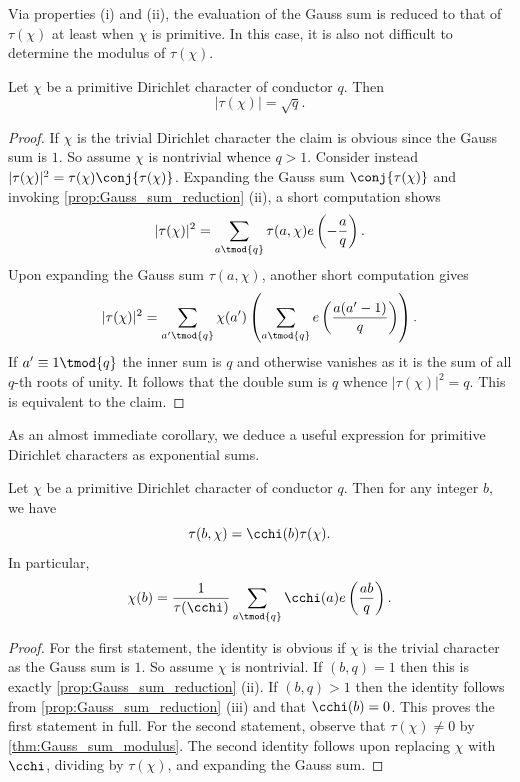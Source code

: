 \documentclass[12pt]{article}
\begin{document}
      Via properties (i) and (ii), the evaluation of the Gauss sum is reduced to that of \(\tau(\chi)\) at least when \(\chi\) is primitive. In this case, it is also not difficult to determine the modulus of \(\tau(\chi)\).

      \begin{theorem}\label{thm:Gauss_sum_modulus}
        Let \(\chi\) be a primitive Dirichlet character of conductor \(q\). Then
        \[
          |\tau(\chi)| = \sqrt{q}.
        \]
      \end{theorem}
      \begin{proof}
        If \(\chi\) is the trivial Dirichlet character the claim is obvious since the Gauss sum is \(1\). So assume \(\chi\) is nontrivial whence \(q > 1\). Consider instead \(|\tau(\chi)|^{2} = \tau(\chi)\conj{\tau(\chi)}\). Expanding the Gauss sum \(\conj{\tau(\chi)}\) and invoking \cref{prop:Gauss_sum_reduction} (ii), a short computation shows
        \[
          |\tau(\chi)|^{2} = \sum_{a \tmod{q}}\tau(a,\chi)e\left(-\frac{a}{q}\right).
        \]
        Upon expanding the Gauss sum \(\tau(a,\chi)\), another short computation gives
        \[
          |\tau(\chi)|^{2} = \sum_{a' \tmod{q}}\chi(a')\left(\sum_{a \tmod{q}}e\left(\frac{a(a'-1)}{q}\right)\right).
        \]
        If \(a' \equiv 1 \tmod{q}\) the inner sum is \(q\) and otherwise vanishes as it is the sum of all \(q\)-th roots of unity. It follows that the double sum is \(q\) whence \(|\tau(\chi)|^{2} = q\). This is equivalent to the claim.
      \end{proof}

      As an almost immediate corollary, we deduce a useful expression for primitive Dirichlet characters as exponential sums.

      \begin{corollary}\label{cor:gauss_sum_primitive_formula}
        Let \(\chi\) be a primitive Dirichlet character of conductor \(q\). Then for any integer \(b\), we have
        \[
          \tau(b,\chi) = \cchi(b)\tau(\chi).
        \]
        In particular,
        \[
          \chi(b) = \frac{1}{\tau(\cchi)}\sum_{a \tmod{q}}\cchi(a)e\left(\frac{ab}{q}\right).
        \]
      \end{corollary}
      \begin{proof}
        For the first statement, the identity is obvious if \(\chi\) is the trivial character as the Gauss sum is \(1\). So assume \(\chi\) is nontrivial. If \((b,q) = 1\) then this is exactly \cref{prop:Gauss_sum_reduction} (ii). If \((b,q) > 1\) then the identity follows from \cref{prop:Gauss_sum_reduction} (iii) and that \(\cchi(b) = 0\). This proves the first statement in full. For the second statement, observe that \(\tau(\chi) \neq 0\) by \cref{thm:Gauss_sum_modulus}. The second identity follows upon replacing \(\chi\) with \(\cchi\), dividing by \(\tau(\chi)\), and expanding the Gauss sum.
      \end{proof}
\end{document}
